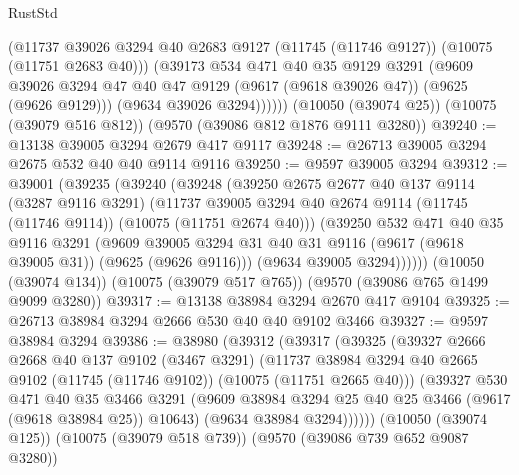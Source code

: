 \begin{lexlean}{RustStd}
\begin{coremodule}
            (@11737
              @39026
              @3294
              @40
              @2683
              @9127
              (@11745 (@11746 @9127))
              (@10075 (@11751 @2683 @40)))
            (@39173
              @534
              @471
              @40
              @35
              @9129
              @3291
              (@9609
                @39026
                @3294
                @47
                @40
                @47
                @9129
                (@9617 (@9618 @39026 @47))
                (@9625 (@9626 @9129)))
              (@9634 @39026 @3294))))))
    (@10050 (@39074 @25))
    (@10075 (@39079 @516 @812))
    (@9570 (@39086 @812 @1876 @9111 @3280))
@39240 := @13138 @39005 @3294 @2679 @417 @9117
@39248 := @26713 @39005 @3294 @2675 @532 @40 @40 @9114 @9116
@39250 := @9597 @39005 @3294
@39312 := @39001
    (@39235
      (@39240
        (@39248
          (@39250
            @2675
            @2677
            @40
            @137
            @9114
            (@3287 @9116 @3291)
            (@11737
              @39005
              @3294
              @40
              @2674
              @9114
              (@11745 (@11746 @9114))
              (@10075 (@11751 @2674 @40)))
            (@39250
              @532
              @471
              @40
              @35
              @9116
              @3291
              (@9609
                @39005
                @3294
                @31
                @40
                @31
                @9116
                (@9617 (@9618 @39005 @31))
                (@9625 (@9626 @9116)))
              (@9634 @39005 @3294))))))
    (@10050 (@39074 @134))
    (@10075 (@39079 @517 @765))
    (@9570 (@39086 @765 @1499 @9099 @3280))
@39317 := @13138 @38984 @3294 @2670 @417 @9104
@39325 := @26713 @38984 @3294 @2666 @530 @40 @40 @9102 @3466
@39327 := @9597 @38984 @3294
@39386 := @38980
    (@39312
      (@39317
        (@39325
          (@39327
            @2666
            @2668
            @40
            @137
            @9102
            (@3467 @3291)
            (@11737
              @38984
              @3294
              @40
              @2665
              @9102
              (@11745 (@11746 @9102))
              (@10075 (@11751 @2665 @40)))
            (@39327
              @530
              @471
              @40
              @35
              @3466
              @3291
              (@9609 @38984 @3294 @25 @40 @25 @3466 (@9617 (@9618 @38984 @25)) @10643)
              (@9634 @38984 @3294))))))
    (@10050 (@39074 @125))
    (@10075 (@39079 @518 @739))
    (@9570 (@39086 @739 @652 @9087 @3280))

\end{coremodule}
\end{lexlean}
